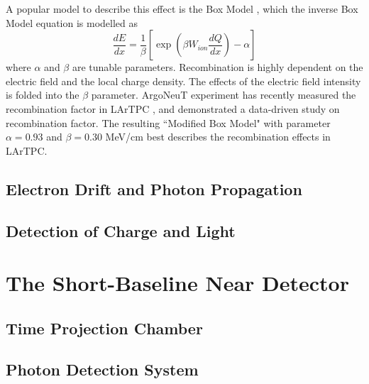 A popular model to describe this effect is the Box Model \cite{}, which the inverse Box Model equation is modelled as \cite{}
\begin{equation}
	\frac{dE}{dx} = \frac{1}{\beta}\left[ \exp{\left( \beta W_{ion}  \frac{dQ}{dx}\right)} -\alpha \right]
\end{equation}
where $\alpha$ and $\beta$ are tunable parameters.
Recombination is highly dependent on the electric field and the local charge density.
The effects of the electric field intensity is folded into the $\beta$ parameter.
ArgoNeuT experiment has recently measured the recombination factor in LArTPC \cite{}, and demonstrated a data-driven study on recombination factor.
The resulting ``Modified Box Model" with parameter $\alpha = 0.93$ and $\beta = 0.30 $ MeV/cm best describes the recombination effects in LArTPC.

\subsection{Electron Drift and Photon Propagation}
\label{sec3:propagration}



\subsection{Detection of Charge and Light}
\label{sec3:detection}


\section{The Short-Baseline Near Detector}



\subsection{Time Projection Chamber}

\subsection{Photon Detection System}

